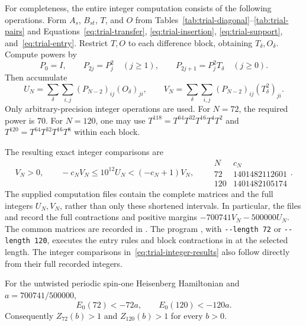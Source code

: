 For completeness, the entire integer computation consists of the
following operations. Form $A_s$, $B_{st}$, $T$, and $O$ from
Tables~\ref{tab:trial-diagonal}--\ref{tab:trial-pairs} and
Equations~\eqref{eq:trial-transfer}, \eqref{eq:trial-insertion},
\eqref{eq:trial-support}, and~\eqref{eq:trial-entry}.
Restrict $T,O$ to each difference block, obtaining $T_\delta,O_\delta$.
Compute powers by
\[
 P_0=I,\qquad
 P_{2j}=P_j^2\quad(j\ge1),\qquad
 P_{2j+1}=P_j^2T_\delta\quad(j\ge0).
\]
Then accumulate
\begin{equation}\label{eq:trial-integer-algorithm}
 U_N=\sum_\delta\sum_{i,j}
       (P_{N-2})_{ij}(O_\delta)_{ji},
 \qquad
 V_N=\sum_\delta\sum_{i,j}
       (P_{N-2})_{ij}(T_\delta^2)_{ji}.
\end{equation}
Only arbitrary-precision integer operations are used.
For $N=72$, the required power is $70$.
For $N=120$, one may use
$T^{118}=T^{64}T^{32}T^{16}T^4T^2$ and
$T^{120}=T^{64}T^{32}T^{16}T^8$ within each block.

The resulting exact integer comparisons are
\begin{equation}\label{eq:trial-integer-results}
 V_N>0,\qquad
 -c_NV_N\le10^{12}U_N<(-c_N+1)V_N,
 \qquad
 \begin{array}{c|r}
 N&c_N\\ \hline
 72&1401482112601\\
 120&1401482105174
 \end{array}.
\end{equation}
The supplied computation files contain the complete matrices and the
full integers $U_N,V_N$, rather than only these shortened intervals.
In particular, the files
 and
record the full contractions and positive margins
$-700741V_N-500000U_N$. The common matrices are recorded in
.
The program ,
with \texttt{-{}-length 72} or \texttt{-{}-length 120}, executes the
entry rules and block contractions in
 at the selected length.
The integer comparisons in~\eqref{eq:trial-integer-results} also
follow directly from their full recorded integers.

\begin{lemma}\label{lem:trial-inputs}
For the untwisted periodic spin-one Heisenberg Hamiltonian and
$a=700741/500000$,
\[
 E_0(72)<-72a,\qquad E_0(120)<-120a.
\]
Consequently $Z_{72}(b)>1$ and $Z_{120}(b)>1$ for every $b>0$.
\end{lemma}

